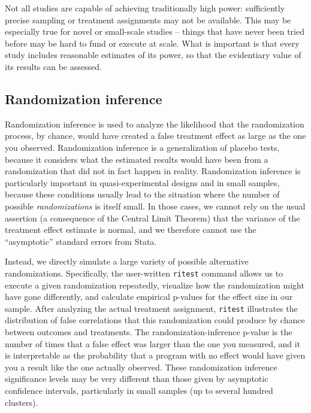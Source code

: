 Not all studies are capable of achieving traditionally high power:
sufficiently precise sampling or treatment assignments may not be available.
This may be especially true for novel or small-scale studies --
things that have never been tried before may be hard to fund or execute at scale.
What is important is that every study includes reasonable estimates of its power,
so that the evidentiary value of its results can be assessed.

\subsection{Randomization inference}

Randomization inference is used to analyze the likelihood
that the randomization process, by chance,
would have created a false treatment effect as large as the one you observed.
Randomization inference is a generalization of placebo tests,
because it considers what the estimated results would have been
from a randomization that did not in fact happen in reality.
Randomization inference is particularly important
in quasi-experimental designs and in small samples,
because these conditions usually lead to the situation
where the number of possible \textit{randomizations} is itself small.
In those cases, we cannot rely on the usual assertion
(a consequence of the Central Limit Theorem)
that the variance of the treatment effect estimate is normal,
and we therefore cannot use the ``asymptotic'' standard errors from Stata.

Instead, we directly simulate a large variety of possible alternative randomizations.
Specifically, the user-written \texttt{ritest} command
allows us to execute a given randomization repeatedly,
visualize how the randomization might have gone differently,
and calculate empirical p-values for the effect size in our sample.
After analyzing the actual treatment assignment,
\texttt{ritest} illustrates the distribution of false correlations
that this randomization could produce by chance
between outcomes and treatments.
The randomization-inference p-value is the number of times
that a false effect was larger than the one you measured,
and it is interpretable as the probability that a program with no effect
would have given you a result like the one actually observed.
These randomization inference
significance levels may be very different
than those given by asymptotic confidence intervals,
particularly in small samples (up to several hundred clusters).

